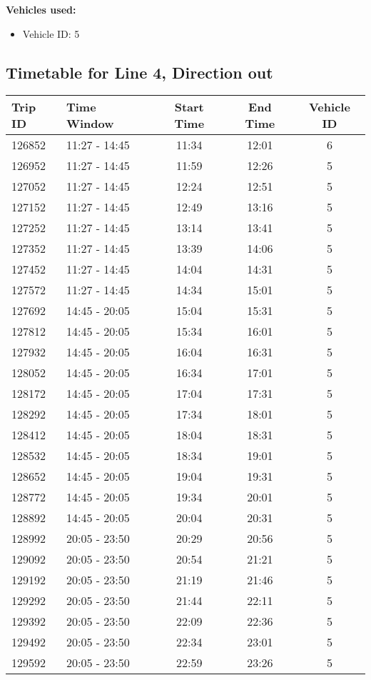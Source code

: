 \documentclass{article}
\begin{document}
\textbf{Vehicles used:}
\begin{itemize}
  \item Vehicle ID: 5
\end{itemize}

\subsection*{Timetable for Line 4, Direction out}
\begin{tabular}{llccc}
\toprule
Trip ID & Time Window & Start Time & End Time & Vehicle ID \\
\midrule
126852 & 11:27 - 14:45 & 11:34 & 12:01 & 6 \\
126952 & 11:27 - 14:45 & 11:59 & 12:26 & 5 \\
127052 & 11:27 - 14:45 & 12:24 & 12:51 & 5 \\
127152 & 11:27 - 14:45 & 12:49 & 13:16 & 5 \\
127252 & 11:27 - 14:45 & 13:14 & 13:41 & 5 \\
127352 & 11:27 - 14:45 & 13:39 & 14:06 & 5 \\
127452 & 11:27 - 14:45 & 14:04 & 14:31 & 5 \\
127572 & 11:27 - 14:45 & 14:34 & 15:01 & 5 \\
127692 & 14:45 - 20:05 & 15:04 & 15:31 & 5 \\
127812 & 14:45 - 20:05 & 15:34 & 16:01 & 5 \\
127932 & 14:45 - 20:05 & 16:04 & 16:31 & 5 \\
128052 & 14:45 - 20:05 & 16:34 & 17:01 & 5 \\
128172 & 14:45 - 20:05 & 17:04 & 17:31 & 5 \\
128292 & 14:45 - 20:05 & 17:34 & 18:01 & 5 \\
128412 & 14:45 - 20:05 & 18:04 & 18:31 & 5 \\
128532 & 14:45 - 20:05 & 18:34 & 19:01 & 5 \\
128652 & 14:45 - 20:05 & 19:04 & 19:31 & 5 \\
128772 & 14:45 - 20:05 & 19:34 & 20:01 & 5 \\
128892 & 14:45 - 20:05 & 20:04 & 20:31 & 5 \\
128992 & 20:05 - 23:50 & 20:29 & 20:56 & 5 \\
129092 & 20:05 - 23:50 & 20:54 & 21:21 & 5 \\
129192 & 20:05 - 23:50 & 21:19 & 21:46 & 5 \\
129292 & 20:05 - 23:50 & 21:44 & 22:11 & 5 \\
129392 & 20:05 - 23:50 & 22:09 & 22:36 & 5 \\
129492 & 20:05 - 23:50 & 22:34 & 23:01 & 5 \\
129592 & 20:05 - 23:50 & 22:59 & 23:26 & 5 \\
\bottomrule
\end{tabular}
\end{document}
